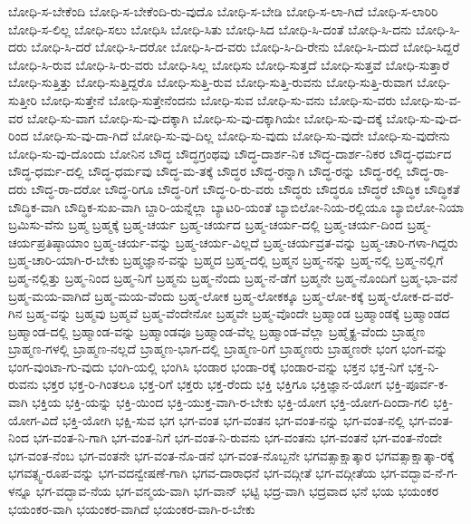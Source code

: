 {ಬೋಧಿ-ಸ-ಬೇಕೆಂದಿ
ಬೋಧಿ-ಸ-ಬೇಕೆಂದಿ-ರು-ವುದೊ
ಬೋಧಿ-ಸ-ಬೇಡಿ
ಬೋಧಿ-ಸ-ಲಾ-ಗಿದೆ
ಬೋಧಿ-ಸ-ಲಾರಿರಿ
ಬೋಧಿ-ಸ-ಲಿಲ್ಲ
ಬೋಧಿ-ಸಲು
ಬೋಧಿಸಿ
ಬೋಧಿ-ಸಿತು
ಬೋಧಿ-ಸಿದ
ಬೋಧಿ-ಸಿ-ದಂತೆ
ಬೋಧಿ-ಸಿ-ದನು
ಬೋಧಿ-ಸಿ-ದರು
ಬೋಧಿ-ಸಿ-ದರೆ
ಬೋಧಿ-ಸಿ-ದರೋ
ಬೋಧಿ-ಸಿ-ದ-ವರು
ಬೋಧಿ-ಸಿ-ದಿ-ರೇನು
ಬೋಧಿ-ಸಿ-ದುದೆ
ಬೋಧಿ-ಸಿದ್ದರೆ
ಬೋಧಿ-ಸಿ-ರುವ
ಬೋಧಿ-ಸಿ-ರು-ವರು
ಬೋಧಿ-ಸಿಲ್ಲ
ಬೋಧಿಸು
ಬೋಧಿ-ಸುತ್ತದೆ
ಬೋಧಿ-ಸುತ್ತವೆ
ಬೋಧಿ-ಸುತ್ತಾರೆ
ಬೋಧಿ-ಸುತ್ತಿತ್ತು
ಬೋಧಿ-ಸುತ್ತಿದ್ದರೊ
ಬೋಧಿ-ಸುತ್ತಿ-ರುವ
ಬೋಧಿ-ಸುತ್ತಿ-ರುವನು
ಬೋಧಿ-ಸುತ್ತಿ-ರುವಾಗ
ಬೋಧಿ-ಸುತ್ತೀರಿ
ಬೋಧಿ-ಸುತ್ತೇನೆ
ಬೋಧಿ-ಸುತ್ತೇನೆಂದನು
ಬೋಧಿ-ಸುವ
ಬೋಧಿ-ಸು-ವನು
ಬೋಧಿ-ಸು-ವರು
ಬೋಧಿ-ಸು-ವ-ವರ
ಬೋಧಿ-ಸು-ವಾಗ
ಬೋಧಿ-ಸು-ವು-ದಕ್ಕಾಗಿ
ಬೋಧಿ-ಸು-ವು-ದಕ್ಕಾಗಿಯೇ
ಬೋಧಿ-ಸು-ವು-ದಕ್ಕೆ
ಬೋಧಿ-ಸು-ವು-ದ-ರಿಂದ
ಬೋಧಿ-ಸು-ವು-ದಾ-ಗಿದೆ
ಬೋಧಿ-ಸು-ವು-ದಿಲ್ಲ
ಬೋಧಿ-ಸು-ವುದು
ಬೋಧಿ-ಸು-ವುದೇ
ಬೋಧಿ-ಸು-ವುದೇನು
ಬೋಧಿ-ಸು-ವು-ದೊಂದು
ಬೋನಿನ
ಬೌದ್ಧ
ಬೌದ್ಧಗ್ರಂಥವು
ಬೌದ್ಧ-ದಾರ್ಶ-ನಿಕ
ಬೌದ್ಧ-ದಾರ್ಶ-ನಿಕರ
ಬೌದ್ಧ-ಧರ್ಮದ
ಬೌದ್ಧ-ಧರ್ಮ-ದಲ್ಲಿ
ಬೌದ್ಧ-ಧರ್ಮವು
ಬೌದ್ಧ-ಮ-ತಕ್ಕೆ
ಬೌದ್ಧರ
ಬೌದ್ಧ-ರನ್ನಾಗಿ
ಬೌದ್ಧ-ರನ್ನು
ಬೌದ್ಧ-ರಲ್ಲಿ
ಬೌದ್ಧ-ರಾ-ದರು
ಬೌದ್ಧ-ರಾ-ದರೋ
ಬೌದ್ಧ-ರಿಗೂ
ಬೌದ್ಧ-ರಿಗೆ
ಬೌದ್ಧ-ರಿ-ರು-ವರು
ಬೌದ್ಧರು
ಬೌದ್ಧರೂ
ಬೌದ್ಧರೆ
ಬೌದ್ಧಿಕ
ಬೌದ್ಧಿಕತೆ
ಬೌದ್ಧಿಕ-ವಾಗಿ
ಬೌದ್ಧಿಕ-ಸುಖ-ವಾಗಿ
ಬ್ದಾರಿ-ಯನ್ನೆಲ್ಲಾ
ಬ್ಯಾಟರಿ-ಯಂತೆ
ಬ್ಯಾಬಿಲೋ-ನಿಯ-ರಲ್ಲಿಯೂ
ಬ್ಯಾಬಿಲೋ-ನಿಯಾ
ಬ್ರಮಿಸು-ವೆನು
ಬ್ರಹ್ಮ
ಬ್ರಹ್ಮಕ್ಕೆ
ಬ್ರಹ್ಮ-ಚರ್ಯ
ಬ್ರಹ್ಮ-ಚರ್ಯದ
ಬ್ರಹ್ಮ-ಚರ್ಯ-ದಲ್ಲಿ
ಬ್ರಹ್ಮ-ಚರ್ಯ-ದಿಂದ
ಬ್ರಹ್ಮ-ಚರ್ಯಪ್ರತಿಷ್ಠಾಯಾಂ
ಬ್ರಹ್ಮ-ಚರ್ಯ-ವನ್ನು
ಬ್ರಹ್ಮ-ಚರ್ಯ-ವಿಲ್ಲದೆ
ಬ್ರಹ್ಮ-ಚರ್ಯವ್ರತ-ವನ್ನು
ಬ್ರಹ್ಮ-ಚಾರಿ-ಗಳಾ-ಗಿದ್ದರು
ಬ್ರಹ್ಮ-ಚಾರಿ-ಯಾಗಿ-ರ-ಬೇಕು
ಬ್ರಹ್ಮಜ್ಞಾನ-ವನ್ನು
ಬ್ರಹ್ಮದ
ಬ್ರಹ್ಮ-ದಲ್ಲಿ
ಬ್ರಹ್ಮನ
ಬ್ರಹ್ಮ-ನನ್ನು
ಬ್ರಹ್ಮ-ನಲ್ಲಿ
ಬ್ರಹ್ಮ-ನಲ್ಲಿಗೆ
ಬ್ರಹ್ಮ-ನಲ್ಲಿತ್ತು
ಬ್ರಹ್ಮ-ನಿಂದ
ಬ್ರಹ್ಮ-ನಿಗೆ
ಬ್ರಹ್ಮನು
ಬ್ರಹ್ಮ-ನೆಂದು
ಬ್ರಹ್ಮ-ನೆ-ಡೆಗೆ
ಬ್ರಹ್ಮನೇ
ಬ್ರಹ್ಮ-ನೊಂದಿಗೆ
ಬ್ರಹ್ಮ-ಭಾ-ವನೆ
ಬ್ರಹ್ಮ-ಮಯ-ವಾಗಿದೆ
ಬ್ರಹ್ಮ-ಮಯ-ವೆಂದು
ಬ್ರಹ್ಮ-ಲೋಕ
ಬ್ರಹ್ಮ-ಲೋಕಕ್ಕೂ
ಬ್ರಹ್ಮ-ಲೋ-ಕಕ್ಕೆ
ಬ್ರಹ್ಮ-ಲೋಕ-ದ-ವರೆ-ಗಿನ
ಬ್ರಹ್ಮ-ವನ್ನು
ಬ್ರಹ್ಮವು
ಬ್ರಹ್ಮವೆ
ಬ್ರಹ್ಮ-ವೆಂದೇನೋ
ಬ್ರಹ್ಮವೇ
ಬ್ರಹ್ಮ-ವೊಂದೇ
ಬ್ರಹ್ಮಾಂಡ
ಬ್ರಹ್ಮಾಂಡಕ್ಕೆ
ಬ್ರಹ್ಮಾಂಡದ
ಬ್ರಹ್ಮಾಂಡ-ದಲ್ಲಿ
ಬ್ರಹ್ಮಾಂಡ-ವನ್ನು
ಬ್ರಹ್ಮಾಂಡವೂ
ಬ್ರಹ್ಮಾಂಡ-ವೆಲ್ಲ
ಬ್ರಹ್ಮಾಂಡ-ವೆಲ್ಲಾ
ಬ್ರಹ್ಮೈಕ್ಯ-ವೆಂದು
ಬ್ರಾಹ್ಮಣ
ಬ್ರಾಹ್ಮಣ-ಗಳಲ್ಲಿ
ಬ್ರಾಹ್ಮಣ-ನಲ್ಲದೆ
ಬ್ರಾಹ್ಮಣ-ಭಾಗ-ದಲ್ಲಿ
ಬ್ರಾಹ್ಮಣ-ರಿಗೆ
ಬ್ರಾಹ್ಮಣರು
ಬ್ರಾಹ್ಮಣರೇ
ಭಂಗ
ಭಂಗ-ವನ್ನು
ಭಂಗ-ವುಂಟಾ-ಗು-ವುದು
ಭಂಗಿ-ಯಲ್ಲಿ
ಭಂಗಿಸಿ
ಭಂಡಾರ
ಭಂಡಾ-ರಕ್ಕೆ
ಭಂಡಾರ-ವನ್ನು
ಭಕ್ತನ
ಭಕ್ತ-ನಿಗೆ
ಭಕ್ತ-ನಿ-ರುವನು
ಭಕ್ತರ
ಭಕ್ತ-ರಿ-ಗಿಂತಲೂ
ಭಕ್ತ-ರಿಗೆ
ಭಕ್ತರು
ಭಕ್ತ-ರೆಂದು
ಭಕ್ತಿ
ಭಕ್ತಿಗೂ
ಭಕ್ತಿಜ್ಞಾನ-ಯೋಗ
ಭಕ್ತಿ-ಪೂರ್ವ-ಕ-ವಾಗಿ
ಭಕ್ತಿಯ
ಭಕ್ತಿ-ಯನ್ನು
ಭಕ್ತಿ-ಯಿಂದ
ಭಕ್ತಿ-ಯುಕ್ತ-ವಾಗಿ-ರ-ಬೇಕು
ಭಕ್ತಿ-ಯೋಗ
ಭಕ್ತಿ-ಯೋಗ-ದಿಂದಾ-ಗಲಿ
ಭಕ್ತಿ-ಯೋಗ-ವಿದೆ
ಭಕ್ತಿ-ಯೋಗಿ
ಭಕ್ಷಿ-ಸುವ
ಭಗ
ಭಗ-ವಂತ
ಭಗ-ವಂತನ
ಭಗ-ವಂತ-ನನ್ನು
ಭಗ-ವಂತ-ನಲ್ಲಿ
ಭಗ-ವಂತ-ನಿಂದ
ಭಗ-ವಂತ-ನಿ-ಗಾಗಿ
ಭಗ-ವಂತ-ನಿಗೆ
ಭಗ-ವಂತ-ನಿ-ರುವನು
ಭಗ-ವಂತನು
ಭಗ-ವಂತನೆ
ಭಗ-ವಂತ-ನೆಂದೇ
ಭಗ-ವಂತ-ನೆಂಬ
ಭಗ-ವಂತನೇ
ಭಗ-ವಂತ-ನೊ-ಡನೆ
ಭಗ-ವಂತ-ನೊಬ್ಬನೇ
ಭಗವತ್ಸಾಕ್ಷಾತ್ಕಾರ
ಭಗವತ್ಸಾಕ್ಷಾತ್ಕಾ-ರಕ್ಕೆ
ಭಗವತ್ಸ್ವ-ರೂಪ-ವನ್ನು
ಭಗ-ವದನ್ವೇಷಣೆ-ಗಾಗಿ
ಭಗವ-ದಾರಾಧನೆ
ಭಗ-ವದ್ಗೀತೆ
ಭಗ-ವದ್ಗೀತೆಯ
ಭಗ-ವದ್ಭಾವ-ನೆ-ಗ-ಳನ್ನೂ
ಭಗ-ವದ್ಭಾವ-ನೆಯ
ಭಗ-ವನ್ಮಯ-ವಾಗಿ
ಭಗ-ವಾನ್
ಭಟ್ಟಿ
ಭದ್ರ-ವಾಗಿ
ಭದ್ರವಾದ
ಭನೆ
ಭಯ
ಭಯಂಕರ
ಭಯಂಕರ-ವಾಗಿ
ಭಯಂಕರ-ವಾಗಿದೆ
ಭಯಂಕರ-ವಾಗಿ-ರ-ಬೇಕು
}

